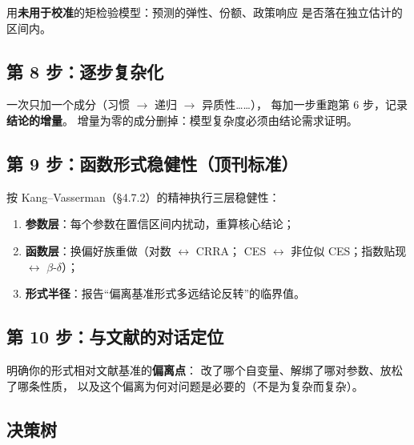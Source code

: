 用\textbf{未用于校准}的矩检验模型：预测的弹性、份额、政策响应
是否落在独立估计的区间内。

\subsection{第 8 步：逐步复杂化}

一次只加一个成分（习惯 $\to$ 递归 $\to$ 异质性……），
每加一步重跑第 6 步，记录\textbf{结论的增量}。
增量为零的成分删掉：模型复杂度必须由结论需求证明。

\subsection{第 9 步：函数形式稳健性（顶刊标准）}

按 Kang--Vasserman（§4.7.2）的精神执行三层稳健性：
\begin{enumerate}
  \item \textbf{参数层}：每个参数在置信区间内扰动，重算核心结论；
  \item \textbf{函数层}：换偏好族重做（对数 $\leftrightarrow$ CRRA；
        CES $\leftrightarrow$ 非位似 CES；指数贴现 $\leftrightarrow$ $\beta$-$\delta$）；
  \item \textbf{形式半径}：报告“偏离基准形式多远结论反转”的临界值。
\end{enumerate}

\subsection{第 10 步：与文献的对话定位}

明确你的形式相对文献基准的\textbf{偏离点}：
改了哪个自变量、解绑了哪对参数、放松了哪条性质，
以及这个偏离为何对问题是必要的（不是为复杂而复杂）。

\subsection{决策树}

